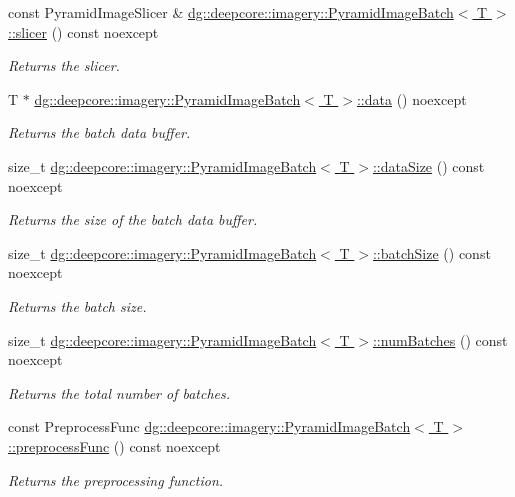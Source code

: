 \begin{DoxyCompactItemize}
const Pyramid\+Image\+Slicer \& \hyperlink{group___imagery_module_ga8c11e57a0df4dcfabfd28eab4440b3d9}{dg\+::deepcore\+::imagery\+::\+Pyramid\+Image\+Batch$<$ T $>$\+::slicer} () const noexcept
\begin{DoxyCompactList}\small\item\em Returns the slicer. \end{DoxyCompactList}\item 
T $\ast$ \hyperlink{group___imagery_module_ga5ac82c16d79194885581fc6cb07f7f41}{dg\+::deepcore\+::imagery\+::\+Pyramid\+Image\+Batch$<$ T $>$\+::data} () noexcept
\begin{DoxyCompactList}\small\item\em Returns the batch data buffer. \end{DoxyCompactList}\item 
size\+\_\+t \hyperlink{group___imagery_module_gae52827a6e33495ed3b41bc8fa9e956aa}{dg\+::deepcore\+::imagery\+::\+Pyramid\+Image\+Batch$<$ T $>$\+::data\+Size} () const noexcept
\begin{DoxyCompactList}\small\item\em Returns the size of the batch data buffer. \end{DoxyCompactList}\item 
size\+\_\+t \hyperlink{group___imagery_module_gac5041040cb2396c35286067a6be232bc}{dg\+::deepcore\+::imagery\+::\+Pyramid\+Image\+Batch$<$ T $>$\+::batch\+Size} () const noexcept
\begin{DoxyCompactList}\small\item\em Returns the batch size. \end{DoxyCompactList}\item 
size\+\_\+t \hyperlink{group___imagery_module_gadda0749e3c2b759418c8d148858198a9}{dg\+::deepcore\+::imagery\+::\+Pyramid\+Image\+Batch$<$ T $>$\+::num\+Batches} () const noexcept
\begin{DoxyCompactList}\small\item\em Returns the total number of batches. \end{DoxyCompactList}\item 
const Preprocess\+Func \hyperlink{group___imagery_module_gaf8e7737e6e0119039d2d755781450508}{dg\+::deepcore\+::imagery\+::\+Pyramid\+Image\+Batch$<$ T $>$\+::preprocess\+Func} () const noexcept
\begin{DoxyCompactList}\small\item\em Returns the preprocessing function. \end{DoxyCompactList}\item 

\end{DoxyCompactItemize}
